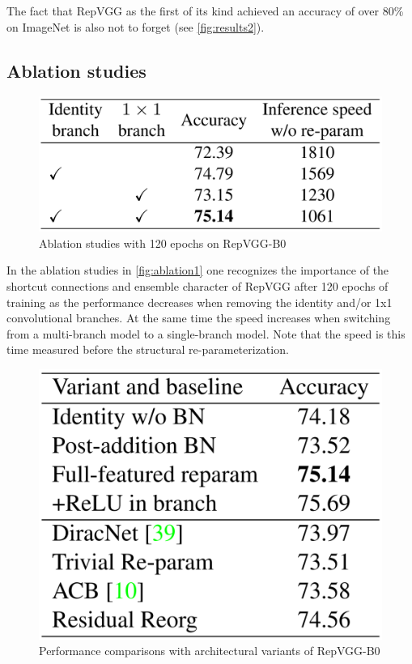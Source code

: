 The fact that RepVGG as the first of its kind achieved an accuracy of over 80\% on ImageNet is also not to forget (see \autoref{fig:results2}).

\subsection{Ablation studies}

\begin{figure}[t]
	\begin{center}
		\includegraphics[width=0.8\linewidth]{images/ablation1.PNG}
	\end{center}
	\caption{Ablation studies with 120 epochs on RepVGG-B0}
	\label{fig:ablation1}
\end{figure}

In the ablation studies in \autoref{fig:ablation1} one recognizes the importance of the shortcut connections and ensemble character of RepVGG after 120 epochs of training as the performance decreases when removing the identity and/or 1x1 convolutional branches. At the same time the speed increases when switching from a multi-branch model to a single-branch model. Note that the speed is this time measured before the structural re-parameterization. 

\begin{figure}[t]
	\begin{center}
		\includegraphics[width=0.8\linewidth]{images/ablation2.PNG}
	\end{center}
	\caption{Performance comparisons with architectural variants of RepVGG-B0}
	\label{fig:ablation2}
\end{figure}

